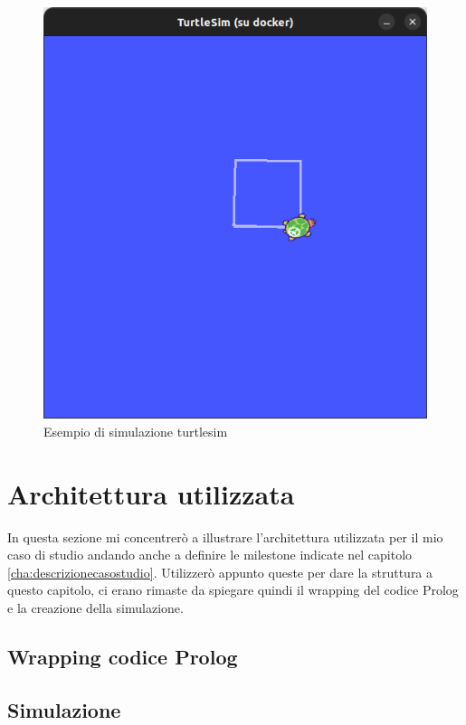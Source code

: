 \begin{figure}[h!]
    \centering
    \includegraphics[scale=0.4]{images/turtlesimes.png}
    \caption{Esempio di simulazione turtlesim}
    \label{fig:turtlesimes}
\end{figure}
\section{Architettura utilizzata}
\label{sec:architettura_utilizzata}
In questa sezione mi concentrerò a illustrare l'architettura utilizzata per il mio caso di studio andando anche a definire le milestone indicate nel capitolo \ref{cha:descrizionecasostudio}.
Utilizzerò appunto queste per dare la struttura a questo capitolo, ci erano rimaste da spiegare quindi il wrapping del codice Prolog e la creazione della simulazione.

\subsection{Wrapping codice Prolog}
\label{subsec:wrappping}

\subsection{Simulazione}
\label{subsec:simulation}

